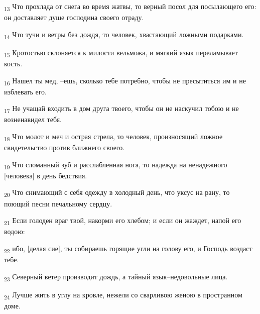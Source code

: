 \begin{tcolorbox}
\textsubscript{13} Что прохлада от снега во время жатвы, то верный посол для посылающего его: он доставляет душе господина своего отраду.
\end{tcolorbox}
\begin{tcolorbox}
\textsubscript{14} Что тучи и ветры без дождя, то человек, хвастающий ложными подарками.
\end{tcolorbox}
\begin{tcolorbox}
\textsubscript{15} Кротостью склоняется к милости вельможа, и мягкий язык переламывает кость.
\end{tcolorbox}
\begin{tcolorbox}
\textsubscript{16} Нашел ты мед, --ешь, сколько тебе потребно, чтобы не пресытиться им и не изблевать его.
\end{tcolorbox}
\begin{tcolorbox}
\textsubscript{17} Не учащай входить в дом друга твоего, чтобы он не наскучил тобою и не возненавидел тебя.
\end{tcolorbox}
\begin{tcolorbox}
\textsubscript{18} Что молот и меч и острая стрела, то человек, произносящий ложное свидетельство против ближнего своего.
\end{tcolorbox}
\begin{tcolorbox}
\textsubscript{19} Что сломанный зуб и расслабленная нога, то надежда на ненадежного [человека] в день бедствия.
\end{tcolorbox}
\begin{tcolorbox}
\textsubscript{20} Что снимающий с себя одежду в холодный день, что уксус на рану, то поющий песни печальному сердцу.
\end{tcolorbox}
\begin{tcolorbox}
\textsubscript{21} Если голоден враг твой, накорми его хлебом; и если он жаждет, напой его водою:
\end{tcolorbox}
\begin{tcolorbox}
\textsubscript{22} ибо, [делая сие], ты собираешь горящие угли на голову его, и Господь воздаст тебе.
\end{tcolorbox}
\begin{tcolorbox}
\textsubscript{23} Северный ветер производит дождь, а тайный язык--недовольные лица.
\end{tcolorbox}
\begin{tcolorbox}
\textsubscript{24} Лучше жить в углу на кровле, нежели со сварливою женою в пространном доме.
\end{tcolorbox}
